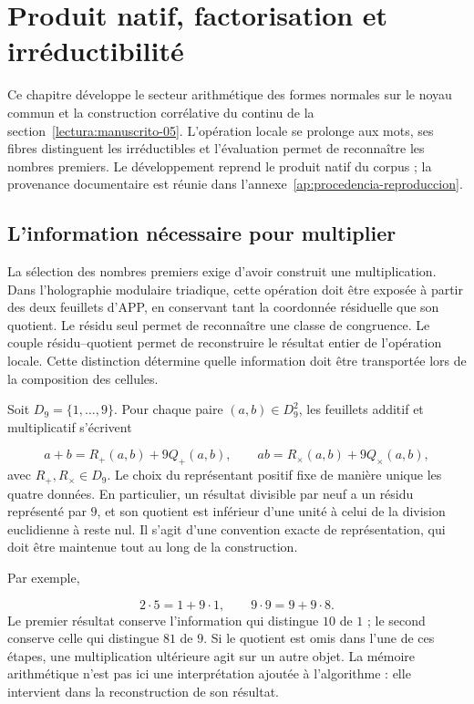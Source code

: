 \section{Produit natif, factorisation et irréductibilité}
\label{lectura:manuscrito-01}
Ce chapitre développe le secteur arithmétique des formes normales sur le noyau commun et la construction corrélative du continu de la section~\ref{lectura:manuscrito-05}. L'opération locale se prolonge aux mots, ses fibres distinguent les irréductibles et l'évaluation permet de reconnaître les nombres premiers. Le développement reprend le produit natif du corpus ; la provenance documentaire est réunie dans l'annexe~\ref{ap:procedencia-reproduccion}.

\subsection{L'information nécessaire pour multiplier}
La sélection des nombres premiers exige d'avoir construit une multiplication. Dans l'holographie modulaire triadique, cette opération doit être exposée à partir des deux feuillets d'APP, en conservant tant la coordonnée résiduelle que son quotient. Le résidu seul permet de reconnaître une classe de congruence. Le couple résidu–quotient permet de reconstruire le résultat entier de l'opération locale. Cette distinction détermine quelle information doit être transportée lors de la composition des cellules.

Soit $D_9=\{1,\ldots,9\}$. Pour chaque paire $(a,b)\in D_9^2$, les feuillets additif et multiplicatif s'écrivent

\[
a+b=R_+(a,b)+9Q_+(a,b),\qquad
ab=R_\times(a,b)+9Q_\times(a,b),
\]
avec $R_+,R_\times\in D_9$. Le choix du représentant positif fixe de manière unique les quatre données. En particulier, un résultat divisible par neuf a un résidu représenté par $9$, et son quotient est inférieur d'une unité à celui de la division euclidienne à reste nul. Il s'agit d'une convention exacte de représentation, qui doit être maintenue tout au long de la construction.

Par exemple,

\[
2\cdot5=1+9\cdot1,\qquad 9\cdot9=9+9\cdot8.
\]
Le premier résultat conserve l'information qui distingue $10$ de $1$ ; le second conserve celle qui distingue $81$ de $9$. Si le quotient est omis dans l'une de ces étapes, une multiplication ultérieure agit sur un autre objet. La mémoire arithmétique n'est pas ici une interprétation ajoutée à l'algorithme : elle intervient dans la reconstruction de son résultat.


